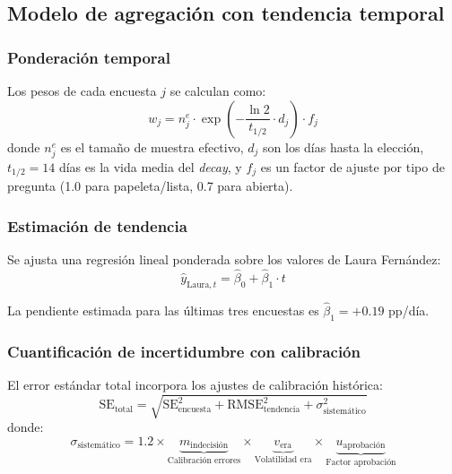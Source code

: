 \documentclass[11pt,a4paper]{article}
\begin{document}
\subsection{Modelo de agregación con tendencia temporal}

\subsubsection{Ponderación temporal}

Los pesos de cada encuesta $j$ se calculan como:
\begin{equation}
w_j = n_j^e \cdot \exp\left(-\frac{\ln 2}{t_{1/2}} \cdot d_j\right) \cdot f_j
\label{eq:pesos}
\end{equation}
donde $n_j^e$ es el tamaño de muestra efectivo, $d_j$ son los días hasta la elección, $t_{1/2} = 14$ días es la vida media del \textit{decay}, y $f_j$ es un factor de ajuste por tipo de pregunta (1.0 para papeleta/lista, 0.7 para abierta).

\subsubsection{Estimación de tendencia}

Se ajusta una regresión lineal ponderada sobre los valores de Laura Fernández:
\begin{equation}
\hat{y}_{\text{Laura},t} = \hat{\beta}_0 + \hat{\beta}_1 \cdot t
\end{equation}

La pendiente estimada para las últimas tres encuestas es $\hat{\beta}_1 = +0.19$ pp/día.

\subsubsection{Cuantificación de incertidumbre con calibración}

El error estándar total incorpora los ajustes de calibración histórica:
\begin{equation}
\text{SE}_{\text{total}} = \sqrt{\text{SE}_{\text{encuesta}}^2 + \text{RMSE}_{\text{tendencia}}^2 + \sigma_{\text{sistemático}}^2}
\label{eq:se_total}
\end{equation}
donde:
\begin{equation}
\sigma_{\text{sistemático}} = 1.2 \times \underbrace{m_{\text{indecisión}}}_{\text{Calibración errores}} \times \underbrace{v_{\text{era}}}_{\text{Volatilidad era}} \times \underbrace{u_{\text{aprobación}}}_{\text{Factor aprobación}}
\end{equation}
\end{document}
